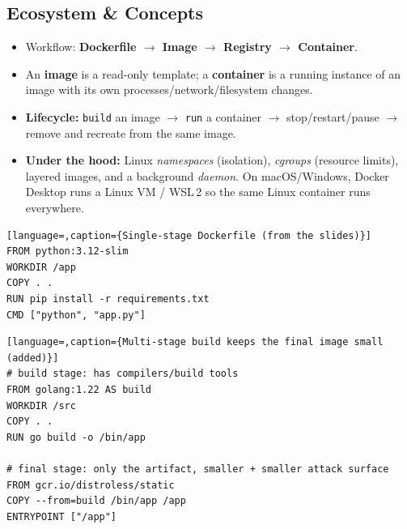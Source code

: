 \documentclass[hidelinks]{article}
\begin{document}
\subsection{Ecosystem \& Concepts}
\begin{itemize}
  \item Workflow: \textbf{Dockerfile $\to$ Image $\to$ Registry $\to$ Container}.
  \item An \textbf{image} is a read-only template; a \textbf{container} is a running instance of an
        image with its own processes/network/filesystem changes.
  \item \textbf{Lifecycle:} \texttt{build} an image $\to$ \texttt{run} a container $\to$
        stop/restart/pause $\to$ remove and recreate from the same image.
  \item \textbf{Under the hood:} Linux \emph{namespaces} (isolation), \emph{cgroups} (resource
        limits), layered images, and a background \emph{daemon}. On macOS/Windows, Docker Desktop
        runs a Linux VM / WSL\,2 so the same Linux container runs everywhere.
\end{itemize}

\begin{lstlisting}[language=,caption={Single-stage Dockerfile (from the slides)}]
FROM python:3.12-slim
WORKDIR /app
COPY . .
RUN pip install -r requirements.txt
CMD ["python", "app.py"]
\end{lstlisting}

\begin{lstlisting}[language=,caption={Multi-stage build keeps the final image small (added)}]
# build stage: has compilers/build tools
FROM golang:1.22 AS build
WORKDIR /src
COPY . .
RUN go build -o /bin/app

# final stage: only the artifact, smaller + smaller attack surface
FROM gcr.io/distroless/static
COPY --from=build /bin/app /app
ENTRYPOINT ["/app"]
\end{lstlisting}
\end{document}
